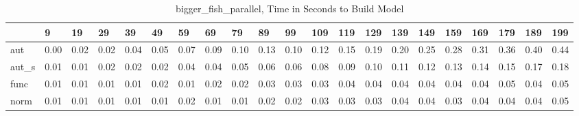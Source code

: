 \begin{table}
\centering
\caption{bigger_fish_parallel, Time in Seconds to Build Model}
\label{bigger_fish_parallel_model_time}
\begin{tabular}{lllllllllllllllllllll}
\toprule
{} &     9 &    19 &    29 &    39 &    49 &    59 &    69 &    79 &    89 &    99 &   109 &   119 &   129 &   139 &   149 &   159 &   169 &   179 &   189 &   199 \\
\midrule
aut   &  0.00 &  0.02 &  0.02 &  0.04 &  0.05 &  0.07 &  0.09 &  0.10 &  0.13 &  0.10 &  0.12 &  0.15 &  0.19 &  0.20 &  0.25 &  0.28 &  0.31 &  0.36 &  0.40 &  0.44 \\
aut\_s &  0.01 &  0.01 &  0.02 &  0.02 &  0.02 &  0.04 &  0.04 &  0.05 &  0.06 &  0.06 &  0.08 &  0.09 &  0.10 &  0.11 &  0.12 &  0.13 &  0.14 &  0.15 &  0.17 &  0.18 \\
func  &  0.01 &  0.01 &  0.01 &  0.01 &  0.02 &  0.01 &  0.02 &  0.02 &  0.03 &  0.03 &  0.03 &  0.04 &  0.04 &  0.04 &  0.04 &  0.04 &  0.04 &  0.05 &  0.04 &  0.05 \\
norm  &  0.01 &  0.01 &  0.01 &  0.01 &  0.01 &  0.02 &  0.01 &  0.01 &  0.02 &  0.02 &  0.03 &  0.03 &  0.03 &  0.04 &  0.04 &  0.03 &  0.04 &  0.04 &  0.04 &  0.05 \\
\bottomrule
\end{tabular}
\end{table}
